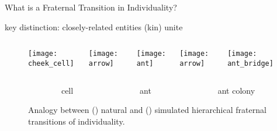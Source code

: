 \begin{frame}{What is a Fraternal Transition in Individuality?}

key distinction: closely-related entities (kin) unite

\pause

\vspace{6ex}

\begin{figure}
\begin{columns}
\begin{column}{0.27\textwidth}
\texttt{[image: cheek\_cell]}
\end{column}
\begin{column}{0.07\textwidth}
\texttt{[image: arrow]}
\end{column}
\begin{column}{0.27\textwidth}
\texttt{[image: ant]}
\end{column}
\begin{column}{0.07\textwidth}
\texttt{[image: arrow]}
\end{column}
\begin{column}{0.27\textwidth}
\texttt{[image: ant\_bridge]}
\end{column}
\end{columns}
\vspace{1ex}
\begin{columns}
\begin{column}{0.05\textwidth}
\end{column}
\begin{column}{0.27\textwidth}
\centering
cell {\tiny\cite{clare_and_ben_2017}}
\end{column}
\begin{column}{0.07\textwidth}
\end{column}
\begin{column}{0.27\textwidth}
\centering
ant {\tiny\cite{quinzani_2008}}
\end{column}
\begin{column}{0.07\textwidth}
\end{column}
\begin{column}{0.27\textwidth}
\centering
ant colony {\tiny\cite{gallice_2011}}
\end{column}
\end{columns}
\vspace{2ex}
\caption{Analogy between () natural and () simulated hierarchical fraternal transitions of individuality.}

\end{figure}


\end{frame}

